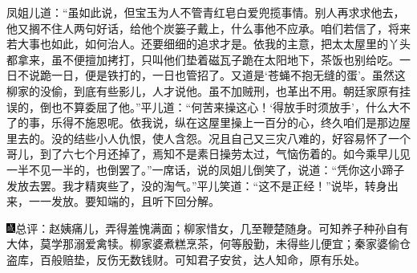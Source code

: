 凤姐儿道：``虽如此说，但宝玉为人不管青红皂白爱兜揽事情。别人再求求他去，他又搁不住人两句好话，给他个炭篓子戴上，什么事他不应承。咱们若信了，将来若大事也如此，如何治人。还要细细的追求才是。依我的主意，把太太屋里的丫头都拿来，虽不便擅加拷打，只叫他们垫着磁瓦子跪在太阳地下，茶饭也别给吃。一日不说跪一日，便是铁打的，一日也管招了。又道是`苍蝇不抱无缝的蛋'。虽然这柳家的没偷，到底有些影儿，人才说他。虽不加贼刑，也革出不用。朝廷家原有挂误的，倒也不算委屈了他。''平儿道：``何苦来操这心！`得放手时须放手'，什么大不了的事，乐得不施恩呢。依我说，纵在这屋里操上一百分的心，终久咱们是那边屋里去的。没的结些小人仇恨，使人含怨。况且自己又三灾八难的，好容易怀了一个哥儿，到了六七个月还掉了，焉知不是素日操劳太过，气恼伤着的。如今乘早儿见一半不见一半的，也倒罢了。''一席话，说的凤姐儿倒笑了，说道：``凭你这小蹄子发放去罢。我才精爽些了，没的淘气。''平儿笑道：``这不是正经！''说毕，转身出来，一一发放。要知端的，且听下回分解。

{\includegraphics[width=3mm]{../Images/00005}总评：赵姨痛儿，弄得羞愧满面；柳家惜女，几至鞭楚随身。可知养子种孙自有大体，莫学那溺爱禽犊。柳家婆煮糕烹茶，何等殷勤，未得些儿便宜；秦家婆偷仓盗库，百般赔垫，反伤无数钱财。可知君子安贫，达人知命，原有乐处。}

